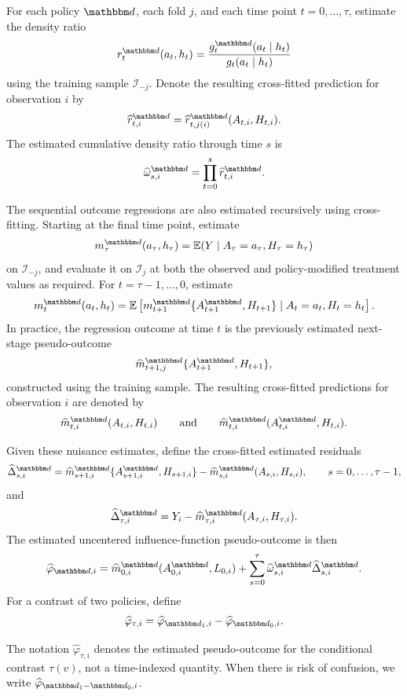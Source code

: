\documentclass[11pt]{article}
\begin{document}
For each policy \(\mathbbm d\), each fold \(j\), and each time point
\(t=0,\ldots,\tau\), estimate the density ratio
\[
  r_t^{\mathbbm d}(a_t,h_t)
  =
  \frac{
    g_t^{\mathbbm d}(a_t\mid h_t)
  }{
    g_t(a_t\mid h_t)
  }
\]
using the training sample \(\mathcal I_{-j}\). Denote the resulting
cross-fitted prediction for observation \(i\) by
\[
  \widehat r_{t,i}^{\mathbbm d}
  =
  \widehat r_{t,j(i)}^{\mathbbm d}(A_{t,i},H_{t,i}).
\]
The estimated cumulative density ratio through time \(s\) is
\[
  \widehat\omega_{s,i}^{\mathbbm d}
  =
  \prod_{t=0}^{s}
  \widehat r_{t,i}^{\mathbbm d}.
\]

The sequential outcome regressions are also estimated recursively using
cross-fitting. Starting at the final time point, estimate
\[
  m_\tau^{\mathbbm d}(a_\tau,h_\tau)
  =
  \mathbb{E}(Y\mid A_\tau=a_\tau,H_\tau=h_\tau)
\]
on \(\mathcal I_{-j}\), and evaluate it on \(\mathcal I_j\) at both the observed
and policy-modified treatment values as required. For
\(t=\tau-1,\ldots,0\), estimate
\[
  m_t^{\mathbbm d}(a_t,h_t)
  =
  \mathbb{E}
  \left[
    m_{t+1}^{\mathbbm d}
    \{A_{t+1}^{\mathbbm d},H_{t+1}\}
    \mid A_t=a_t,H_t=h_t
  \right].
\]
In practice, the regression outcome at time \(t\) is the previously estimated
next-stage pseudo-outcome
\[
  \widehat m_{t+1,j}^{\mathbbm d}
  \{A_{t+1}^{\mathbbm d},H_{t+1}\},
\]
constructed using the training sample. The resulting cross-fitted predictions
for observation \(i\) are denoted by
\[
  \widehat m_{t,i}^{\mathbbm d}(A_{t,i},H_{t,i})
  \qquad\text{and}\qquad
  \widehat m_{t,i}^{\mathbbm d}(A_{t,i}^{\mathbbm d},H_{t,i}).
\]

Given these nuisance estimates, define the cross-fitted estimated residuals
\[
  \widehat\Delta_{s,i}^{\mathbbm d}
  =
  \widehat m_{s+1,i}^{\mathbbm d}
  \{A_{s+1,i}^{\mathbbm d},H_{s+1,i}\}
  -
  \widehat m_{s,i}^{\mathbbm d}(A_{s,i},H_{s,i}),
  \qquad s=0,\ldots,\tau-1,
\]
and
\[
  \widehat\Delta_{\tau,i}^{\mathbbm d}
  =
  Y_i
  -
  \widehat m_{\tau,i}^{\mathbbm d}(A_{\tau,i},H_{\tau,i}).
\]
The estimated uncentered influence-function pseudo-outcome is then
\[
  \widehat\varphi_{\mathbbm d,i}
  =
  \widehat m_{0,i}^{\mathbbm d}(A_{0,i}^{\mathbbm d},L_{0,i})
  +
  \sum_{s=0}^{\tau}
  \widehat\omega_{s,i}^{\mathbbm d}
  \widehat\Delta_{s,i}^{\mathbbm d}.
\]
For a contrast of two policies, define
\[
  \widehat\varphi_{\tau,i}
  =
  \widehat\varphi_{\mathbbm d_1,i}
  -
  \widehat\varphi_{\mathbbm d_0,i}.
\]

\begin{remark}
The notation \(\widehat\varphi_{\tau,i}\) denotes the estimated pseudo-outcome
for the conditional contrast \(\tau(v)\), not a time-indexed quantity. When
there is risk of confusion, we write
\(\widehat\varphi_{\mathbbm d_1-\mathbbm d_0,i}\).
\end{remark}
\end{document}
